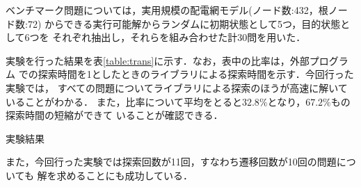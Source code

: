 ベンチマーク問題については，実用規模の配電網モデル(ノード数:432，根ノード数:72)
からできる実行可能解からランダムに初期状態として5つ，目的状態として6つを
それぞれ抽出し，それらを組み合わせた計30問を用いた．

実験を行った結果を表\ref{table:trans}に示す．なお，表中の比率は，外部プログラム
での探索時間を1としたときのライブラリによる探索時間を示す．今回行った実験では，
すべての問題についてライブラリによる探索のほうが高速に解いていることがわかる．
また，比率について平均をとると$32.8\%$となり，$67.2\%$もの探索時間の短縮ができて
いることが確認できる．

\begin{table}[htbp]
 \centering
 \caption{実験結果}
 \label{table:trans}
 
\end{table}

また，今回行った実験では探索回数が11回，すなわち遷移回数が10回の問題についても
解を求めることにも成功している．
